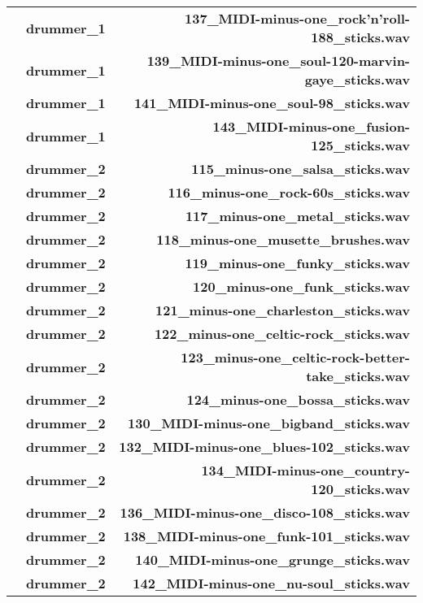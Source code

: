 \begin{table}[H]
\begin{tabular}{l|lr}
            & \textbf{drummer\_1} & \textbf{137\_MIDI-minus-one\_rock'n'roll-188\_sticks.wav} \\
            & \textbf{drummer\_1} & \textbf{139\_MIDI-minus-one\_soul-120-marvin-gaye\_sticks.wav} \\
            & \textbf{drummer\_1} & \textbf{141\_MIDI-minus-one\_soul-98\_sticks.wav} \\
            & \textbf{drummer\_1} & \textbf{143\_MIDI-minus-one\_fusion-125\_sticks.wav} \\
            & \textbf{drummer\_2} & \textbf{115\_minus-one\_salsa\_sticks.wav} \\
            & \textbf{drummer\_2} & \textbf{116\_minus-one\_rock-60s\_sticks.wav} \\
            & \textbf{drummer\_2} & \textbf{117\_minus-one\_metal\_sticks.wav} \\
            & \textbf{drummer\_2} & \textbf{118\_minus-one\_musette\_brushes.wav} \\
            & \textbf{drummer\_2} & \textbf{119\_minus-one\_funky\_sticks.wav} \\
            & \textbf{drummer\_2} & \textbf{120\_minus-one\_funk\_sticks.wav} \\
            & \textbf{drummer\_2} & \textbf{121\_minus-one\_charleston\_sticks.wav} \\
            & \textbf{drummer\_2} & \textbf{122\_minus-one\_celtic-rock\_sticks.wav} \\
            & \textbf{drummer\_2} & \textbf{123\_minus-one\_celtic-rock-better-take\_sticks.wav} \\
            & \textbf{drummer\_2} & \textbf{124\_minus-one\_bossa\_sticks.wav} \\
            & \textbf{drummer\_2} & \textbf{130\_MIDI-minus-one\_bigband\_sticks.wav} \\
            & \textbf{drummer\_2} & \textbf{132\_MIDI-minus-one\_blues-102\_sticks.wav} \\
            & \textbf{drummer\_2} & \textbf{134\_MIDI-minus-one\_country-120\_sticks.wav} \\
            & \textbf{drummer\_2} & \textbf{136\_MIDI-minus-one\_disco-108\_sticks.wav} \\
            & \textbf{drummer\_2} & \textbf{138\_MIDI-minus-one\_funk-101\_sticks.wav} \\
            & \textbf{drummer\_2} & \textbf{140\_MIDI-minus-one\_grunge\_sticks.wav} \\
            & \textbf{drummer\_2} & \textbf{142\_MIDI-minus-one\_nu-soul\_sticks.wav} \\

\end{tabular}
\end{table}
